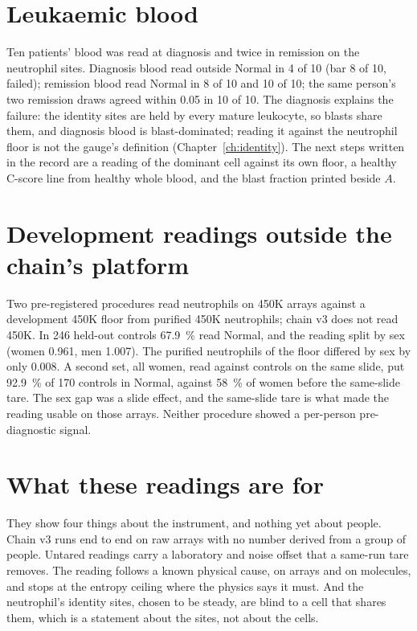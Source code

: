 \section{Leukaemic blood}

Ten patients' blood was read at diagnosis and twice in remission on the neutrophil sites. Diagnosis blood read outside Normal in 4 of 10
(bar 8 of 10, failed); remission blood read Normal in 8 of 10 and 10 of 10; the same person's two remission draws agreed within 0.05 in 10 of 10. \measured{} The diagnosis explains the
failure: the identity sites are held by every mature leukocyte, so blasts share them, and diagnosis blood is blast-dominated; reading it against the neutrophil floor is not the gauge's
definition (Chapter~\ref{ch:identity}). The next steps written in the record are a reading of the dominant cell against its own floor, a healthy C-score line from healthy whole blood, and
the blast fraction printed beside $A$. \openprob

\section{Development readings outside the chain's platform}

Two pre-registered procedures read neutrophils on 450K arrays against a development 450K floor from purified 450K neutrophils; chain v3 does not read 450K.
In 246 held-out controls 67.9~\% read Normal, and the reading split by sex (women 0.961, men 1.007). The purified neutrophils of the
floor differed by sex by only 0.008. A second set, all women, read against controls on the same slide, put 92.9~\% of 170 controls in Normal,
against 58~\% of women before the same-slide tare. \measured{} The sex gap was a slide effect, and the same-slide tare is what made the reading usable on those arrays. Neither procedure showed a
per-person pre-diagnostic signal.

\section{What these readings are for}

They show four things about the instrument, and nothing yet about people. Chain v3 runs end to end on raw arrays with no number derived from a group of people. Untared readings carry a
laboratory and noise offset that a same-run tare removes. The reading follows a known physical cause, on arrays and on molecules, and stops at the entropy ceiling where the physics says
it must. And the neutrophil's identity sites, chosen to be steady, are blind to a cell that shares them, which is a statement about the sites, not about the cells.
